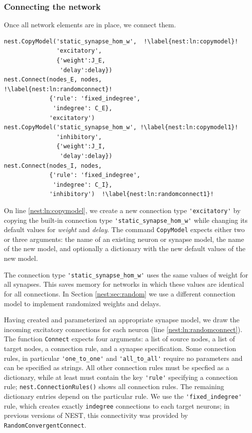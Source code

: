 \documentclass{article}
\begin{document}
\subsubsection{Connecting the network}

Once all network elements are in place, we connect them.

\begin{lstlisting}[name=Brunel_interactive] 
nest.CopyModel('static_synapse_hom_w',  !\label{nest:ln:copymodel}!
               'excitatory',
               {'weight':J_E, 
                'delay':delay})
nest.Connect(nodes_E, nodes,            !\label{nest:ln:randomconnect}!
             {'rule': 'fixed_indegree', 
              'indegree': C_E},
             'excitatory')
nest.CopyModel('static_synapse_hom_w', !\label{nest:ln:copymodel1}!
               'inhibitory',
               {'weight':J_I, 
                'delay':delay})
nest.Connect(nodes_I, nodes,
             {'rule': 'fixed_indegree', 
              'indegree': C_I},
             'inhibitory')  !\label{nest:ln:randomconnect1}!
\end{lstlisting} 

On line \ref{nest:ln:copymodel}, we create a new connection
type \lstinline!'excitatory'! by copying the built-in connection type
\lstinline!'static_synapse_hom_w'! while changing its default values
for \emph{weight} and \emph{delay}. The command \lstinline!CopyModel!
expects either two or three arguments: the name of an existing neuron
or synapse model, the name of the new model, and optionally a
dictionary with the new default values of the new model.

The connection type \lstinline!'static_synapse_hom_w'! uses the same
values of weight for all synapses. This saves memory for
networks in which these values are identical for all connections. In
Section \ref{nest:sec:random} we use a different connection model to
implement randomized weights and delays.

Having created and parameterized an appropriate synapse model, we draw
the incoming excitatory connections for each neuron (line
\ref{nest:ln:randomconnect}). The function
\lstinline!Connect!  expects four arguments: a list of
source nodes, a list of target nodes, a connection rule, and a synapse
specification. Some connection rules, in particular
\lstinline!'one_to_one'! and \lstinline!'all_to_all'! require no
parameters and can be specified as strings. All other connection rules
must be specfied as a dictionary, while at least must contain the key
\lstinline!'rule'! specifying a connection rule;
\lstinline!nest.ConnectionRules()! shows all connection rules. The
remaining dictionary entries depend on the particular rule. We use the
\lstinline!'fixed_indegree'! rule, which creates exactly
\lstinline!indegree! connections to each target neurons; in previous
versions of NEST, this connectivity was provided by
\lstinline!RandomConvergentConnect!. 
\end{document}
